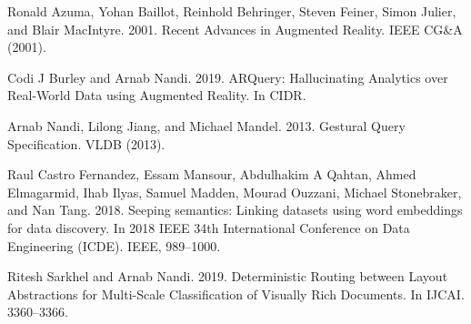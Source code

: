 \documentclass[11pt]{article}
\begin{document}
\begin{thebibliography}{10} 
\itemsep=1pt 
\begin{small}

 Ronald Azuma, Yohan Baillot, Reinhold Behringer, Steven Feiner, Simon Julier, and Blair MacIntyre. 2001. Recent Advances in Augmented Reality. IEEE CG\&A
(2001).

 Codi J Burley and Arnab Nandi. 2019. ARQuery: Hallucinating Analytics over Real-World Data using Augmented Reality. In CIDR.

 Arnab Nandi, Lilong Jiang, and Michael Mandel. 2013. Gestural Query Specification. VLDB (2013).


 Raul Castro Fernandez, Essam Mansour, Abdulhakim A Qahtan, Ahmed Elmagarmid, Ihab Ilyas, Samuel Madden, Mourad Ouzzani, Michael Stonebraker, and Nan Tang. 2018. Seeping semantics: Linking datasets using word embeddings for data discovery. In 2018 IEEE 34th International Conference on Data Engineering (ICDE). IEEE, 989–1000.






 Ritesh Sarkhel and Arnab Nandi. 2019. Deterministic Routing between Layout Abstractions for Multi-Scale Classification of Visually Rich Documents. In IJCAI. 3360–3366.


\end{small}
\end{thebibliography}
\end{document}
